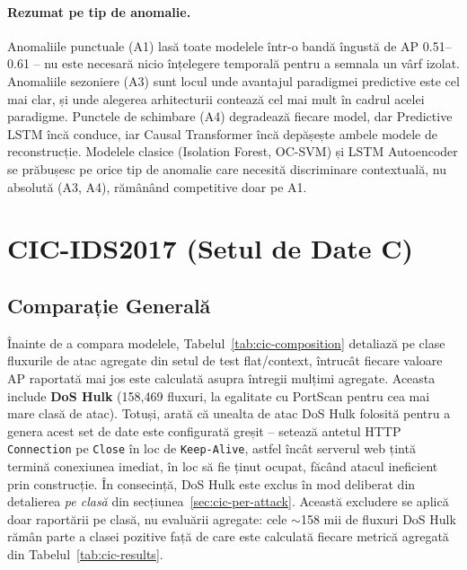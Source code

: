 \paragraph{Rezumat pe tip de anomalie.} Anomaliile punctuale (A1) lasă toate modelele într-o bandă îngustă de AP 0.51--0.61 -- nu este necesară nicio înțelegere temporală pentru a semnala un vârf izolat.
Anomaliile sezoniere (A3) sunt locul unde avantajul paradigmei predictive este cel mai clar, și unde alegerea arhitecturii contează cel mai mult în cadrul acelei paradigme. Punctele de schimbare (A4) degradează fiecare model, dar Predictive LSTM încă conduce, iar Causal Transformer încă depășește ambele modele de reconstrucție. Modelele clasice (Isolation Forest, OC-SVM) și LSTM Autoencoder se prăbușesc pe orice tip de anomalie care necesită discriminare contextuală, nu absolută (A3, A4), rămânând competitive doar pe A1.



\section{CIC-IDS2017 (Setul de Date C)}

\subsection{Comparație Generală}

Înainte de a compara modelele, Tabelul~\ref{tab:cic-composition} detaliază pe clase fluxurile de atac agregate din setul de test flat/context, întrucât fiecare valoare AP raportată mai jos este calculată asupra întregii mulțimi agregate. Aceasta include \textbf{DoS Hulk} (158{,}469 fluxuri, la egalitate cu PortScan pentru cea mai mare clasă de atac).
Totuși, \textcite{engelen2021troubleshooting} arată că unealta de atac DoS Hulk folosită pentru a genera acest set de date este configurată greșit -- setează antetul HTTP \texttt{Connection} pe \texttt{Close} în loc de \texttt{Keep-Alive}, astfel încât serverul web țintă termină conexiunea imediat, în loc să fie ținut ocupat, făcând atacul ineficient prin construcție. 
În consecință, DoS Hulk este exclus în mod deliberat din detalierea \emph{pe clasă} din secțiunea~\ref{sec:cic-per-attack}. Această excludere se aplică doar raportării pe clasă, nu evaluării agregate: cele $\sim$158 mii de fluxuri DoS Hulk rămân parte a clasei pozitive față de care este calculată fiecare metrică agregată din Tabelul~\ref{tab:cic-results}.

